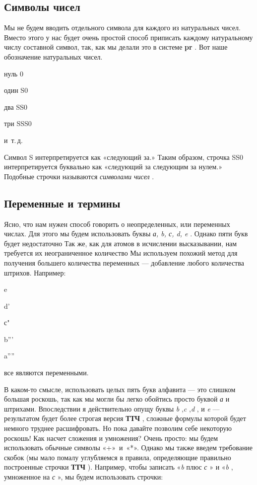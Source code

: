 \documentclass[../main.tex]{subfiles}
\begin{document}
\subsection{Символы чисел}

Мы не будем вводить отдельного символа для каждого из натуральных чисел. Вместо этого у нас будет очень простой способ приписать каждому натуральному числу составной символ, так, как мы делали это в системе \textbf{pr} . Вот наше обозначение натуральных чисел.

нуль 0

один S0

два SS0

три SSS0

и~т.\,д.

Символ S интерпретируется как «следующий за.» Таким образом, строчка SS0 интерпретируется буквально как «следующий за следующим за нулем.» Подобные строчки называются \emph{символами чисел} .


\subsection{Переменные и термины}

Ясно, что нам нужен способ говорить о неопределенных, или переменных числах. Для этого мы будем использовать буквы \emph{а, b, с, d, e} . Однако пяти букв будет недостаточно Так же, как для атомов в исчислении высказывании, нам требуется их неограниченное количество Мы используем похожий метод для получения большего количества переменных --- добавление любого количества штрихов. Например:

e

d'

с"

b'''

a''''

все являются переменными.

В каком-то смысле, использовать целых пять букв алфавита --- это слишком большая роскошь, так как мы могли бы легко обойтись просто буквой \emph{а} и штрихами. Впоследствии я действительно опущу буквы \emph{b} ,\emph{c} ,\emph{d} , и \emph{e} --- результатом будет более строгая версия \textbf{ТТЧ} , сложные формулы которой будет немного труднее расшифровать. Но пока давайте позволим себе некоторую роскошь! Как насчет сложения и умножения? Очень просто: мы будем использовать обычные символы «+»~и~«*». Однако мы также введем требование скобок (мы мало помалу углубляемся в правила, определяющие правильно построенные строчки \textbf{ТТЧ} ). Например, чтобы записать «\emph{b} плюс \emph{с} » и «\emph{b} , умноженное на \emph{с} », мы будем использовать строчки:
\end{document}
